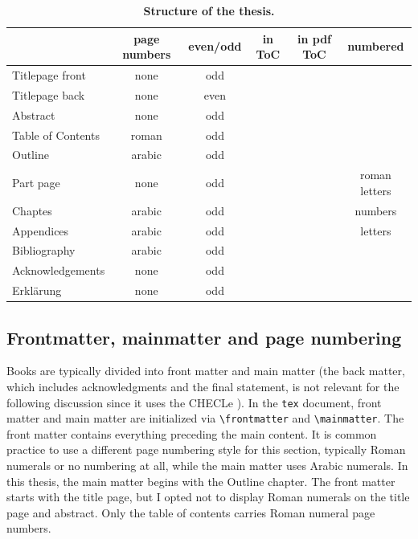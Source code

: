 \begin{table}
	\centering 
	\caption{\textbf{Structure of the thesis.}}
	\label{tab:thesistructure}
	\vspace{5ex}
	\begin{tabular}{lccccc} 
		\toprule
		 & page numbers & even/odd & in ToC & in pdf ToC & numbered  \\ 
		\midrule 
		Titlepage front  & none & odd & \color{bqred}\XSolidBrush& \color{bqgreen} \CheckmarkBold &\color{bqred} \XSolidBrush\\
		Titlepage back & none & even & \color{bqred}\XSolidBrush& \color{bqred}\XSolidBrush& \color{bqred}\XSolidBrush\\
		Abstract & none & odd & \color{bqred}\XSolidBrush& \color{bqgreen}\CheckmarkBold & \color{bqred}\XSolidBrush\\
		Table of Contents & roman & odd & \color{bqred}\XSolidBrush& \color{bqgreen}\CheckmarkBold &\color{bqred} \XSolidBrush\\
		Outline & arabic & odd &\color{bqgreen} \CheckmarkBold &\color{bqgreen} \CheckmarkBold & \color{bqred}\XSolidBrush\\
		Part page & none & odd & \color{bqgreen}\CheckmarkBold & \color{bqgreen}\CheckmarkBold & roman letters\\
		Chaptes & arabic & odd & \color{bqgreen}\CheckmarkBold &\color{bqgreen} \CheckmarkBold & numbers\\
		Appendices & arabic & odd & \color{bqgreen}\CheckmarkBold &\color{bqgreen} \CheckmarkBold & letters\\
		Bibliography & arabic & odd & \color{bqgreen}\CheckmarkBold & \color{bqgreen}\CheckmarkBold & \color{bqred}\XSolidBrush\\
		Acknowledgements & none & odd & \color{bqred}\XSolidBrush& \color{bqgreen}\CheckmarkBold & \color{bqred}\XSolidBrush\\
		Erklärung & none & odd & \color{bqred}\XSolidBrush&\color{bqgreen} \CheckmarkBold & \color{bqred}\XSolidBrush\\
		\bottomrule
	\end{tabular}
\end{table}

\subsection{Frontmatter, mainmatter and page numbering}
Books are typically divided into front matter and main matter (the back matter, which includes acknowledgments and the final statement, is not relevant for the following discussion since it uses the CHECLe
). In the \verb|tex| document, front matter and main matter are initialized via \verb|\frontmatter| and \verb|\mainmatter|. The front matter contains everything preceding the main content. It is common practice to use a different page numbering style for this section, typically Roman numerals or no numbering at all, while the main matter uses Arabic numerals.
In this thesis, the main matter begins with the Outline chapter. The front matter starts with the title page, but I opted not to display Roman numerals on the title page and abstract. Only the table of contents carries Roman numeral page numbers.

